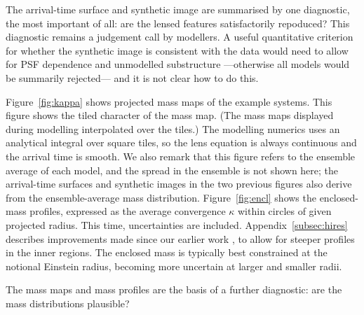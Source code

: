 The arrival-time surface and synthetic image are summarised by one
diagnostic, the most important of all: are the lensed features
satisfactorily repoduced?  This diagnostic remains a judgement call by
modellers.  A useful quantitative criterion for whether the synthetic
image is consistent with the data would need to allow for PSF
dependence and unmodelled substructure ---otherwise all models would
be summarily rejected--- and it is not clear how to do this.

Figure~\ref{fig:kappa} shows projected mass maps of the example
systems.  This figure shows the tiled character of the mass map.  (The
mass maps displayed during modelling interpolated over the tiles.)
The modelling numerics uses an analytical integral over square tiles,
so the lens equation is always continuous and the arrival time is
smooth.  We also remark that this figure refers to the ensemble
average of each model, and the spread in the ensemble is not shown
here; the arrival-time surfaces and synthetic images in the two
previous figures also derive from the ensemble-average mass
distribution.  Figure~\ref{fig:encl} shows the enclosed-mass profiles,
expressed as the average convergence $\kappa$ within circles of given
projected radius.  This time, uncertainties are included.
Appendix~\ref{subsec:hires} describes improvements made since our
earlier work \citep{2015MNRAS.447.2170K}, to allow for steeper
profiles in the inner regions.  The enclosed mass is typically best
constrained at the notional Einstein radius, becoming more uncertain
at larger and smaller radii.

The mass maps and mass profiles are the basis of a further diagnostic:
are the mass distributions plausible?

\endinput



  The ensemble average
can, however, be a useful representative of the whole ensemble.  The
user interface of SpaghettiLens returns graphical representations of
the ensemble-average mass map and some derived quantities to the
modeller for review.  The modeller can post these results on a forum,
or discard them and try again.  Other volunteers can start the
modelling process afresh, or they can take an existing model from the
forum and modify its input spaghetti diagram or its accompanying
options, and thus obtain a revised model.

Alongside is a synthetic image produced by modelling.  In it, the
fitted lensed images are shown in colour, while the lensing galaxy and
extraneous objects have been reduced to grayscale.
) These two
panels are qualitative and display no units, and moreover, the mutual
alignment of the two panels is only approximate.

